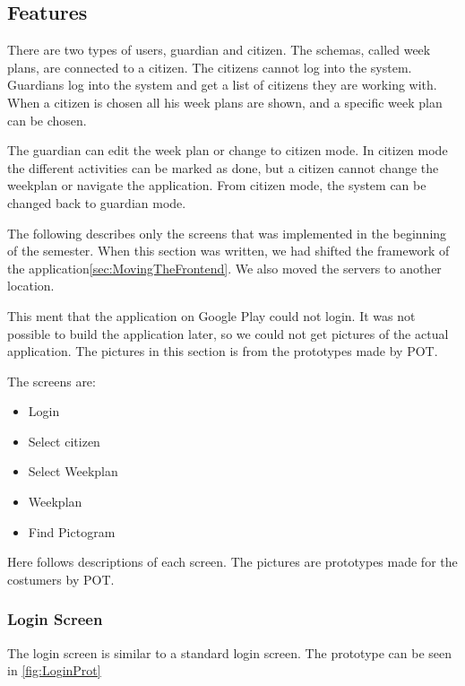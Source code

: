 \subsection{Features}
There are two types of users, \gls{guardian} and \gls{citizen}. The schemas, called week plans, are connected to a \gls{citizen}. The \glspl{citizen} cannot log into the system. Guardians log into the system and get a list of citizens they are working with. When a \gls{citizen} is chosen all his week plans are shown, and a specific week plan can be chosen. 

The guardian can edit the week plan or change to citizen mode. In citizen mode the different activities can be marked as done, but a citizen cannot change the weekplan or navigate the application. From citizen mode, the system can be changed back to guardian mode.

The following describes only the screens that was implemented in the beginning of the semester. When this section was written, we had shifted the framework of the application\ref{sec:MovingTheFrontend}. We also moved the servers to another location.

This ment that the application on Google Play could not login. It was not possible to build the application later, so we could not get pictures of the actual application. The pictures in this section is from the prototypes made by \gls{POT}.


The screens are:
\begin{itemize}
    \item Login
    \item Select citizen 
    \item Select Weekplan 
    \item Weekplan
    \item Find Pictogram
\end{itemize}

Here follows descriptions of each screen. The pictures are prototypes made for the costumers by \gls{POT}. 

\subsubsection*{Login Screen}
The login screen is similar to a standard login screen. The prototype can be seen in \ref{fig:LoginProt}

